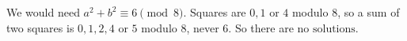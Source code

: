 We would need $a^2+b^2\equiv6\pmod8$. Squares are $0,1$ or $4$ modulo $8$, so a sum of two squares is $0,1,2,4$ or $5$ modulo $8$, never $6$. So there are $\boxed{\text{no solutions}}$.
